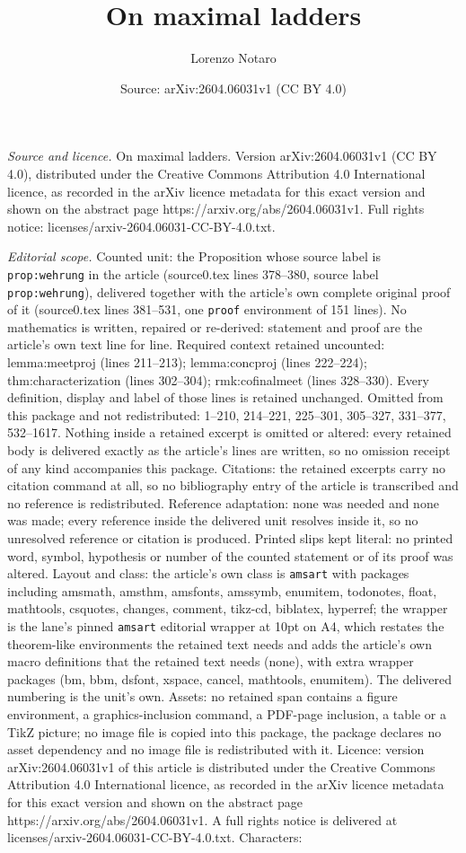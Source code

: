 \documentclass[10pt,a4paper]{amsart}
\title[On maximal ladders]{On maximal ladders}
\author{Lorenzo Notaro}
\date{Source: arXiv:2604.06031v1 (CC BY 4.0)}
\begin{document}
\maketitle

\noindent\emph{Source and licence.} On maximal ladders. Version arXiv:2604.06031v1 (CC BY 4.0), distributed under the Creative Commons Attribution 4.0 International licence, as recorded in the arXiv licence metadata for this exact version and shown on the abstract page https://arxiv.org/abs/2604.06031v1. Full rights notice: licenses/arxiv-2604.06031-CC-BY-4.0.txt.\par\smallskip

\noindent\textit{Editorial scope.} Counted unit: the Proposition whose source label is \texttt{prop:wehrung} in the article (source0.tex lines 378--380, source label \texttt{prop:wehrung}), delivered together with the article's own complete original proof of it (source0.tex lines 381--531, one \texttt{proof} environment of 151 lines). No mathematics is written, repaired or re-derived: statement and proof are the article's own text line for line. Required context retained uncounted: lemma:meetproj (lines 211--213); lemma:concproj (lines 222--224); thm:characterization (lines 302--304); rmk:cofinalmeet (lines 328--330). Every definition, display and label of those lines is retained unchanged. Omitted from this package and not redistributed: 1--210, 214--221, 225--301, 305--327, 331--377, 532--1617. Nothing inside a retained excerpt is omitted or altered: every retained body is delivered exactly as the article's lines are written, so no omission receipt of any kind accompanies this package. Citations: the retained excerpts carry no citation command at all, so no bibliography entry of the article is transcribed and no reference is redistributed. Reference adaptation: none was needed and none was made; every reference inside the delivered unit resolves inside it, so no unresolved reference or citation is produced. Printed slips kept literal: no printed word, symbol, hypothesis or number of the counted statement or of its proof was altered. Layout and class: the article's own class is \texttt{amsart} with packages including amsmath, amsthm, amsfonts, amssymb, enumitem, todonotes, float, mathtools, csquotes, changes, comment, tikz-cd, biblatex, hyperref; the wrapper is the lane's pinned \texttt{amsart} editorial wrapper at 10pt on A4, which restates the theorem-like environments the retained text needs and adds the article's own macro definitions that the retained text needs (none), with extra wrapper packages (bm, bbm, dsfont, xspace, cancel, mathtools, enumitem). The delivered numbering is the unit's own. Assets: no retained span contains a figure environment, a graphics-inclusion command, a PDF-page inclusion, a table or a TikZ picture; no image file is copied into this package, the package declares no asset dependency and no image file is redistributed with it. Licence: version arXiv:2604.06031v1 of this article is distributed under the Creative Commons Attribution 4.0 International licence, as recorded in the arXiv licence metadata for this exact version and shown on the abstract page https://arxiv.org/abs/2604.06031v1. A full rights notice is delivered at licenses/arxiv-2604.06031-CC-BY-4.0.txt. Characters: 
\end{document}
